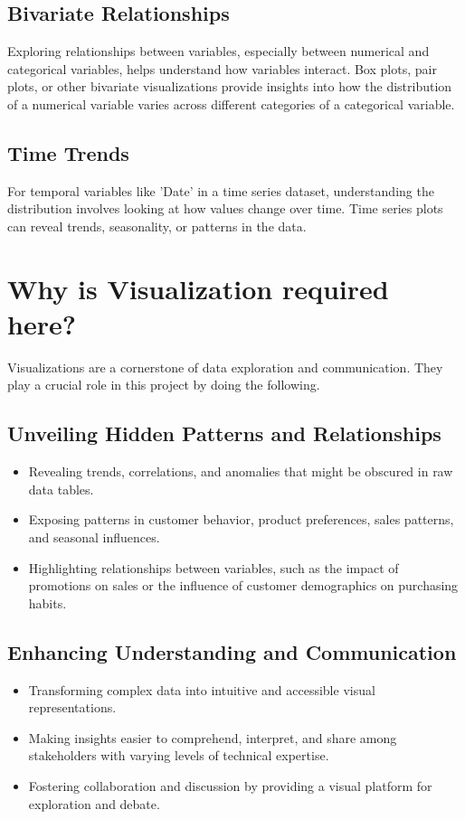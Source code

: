 \subsection{Bivariate Relationships}
Exploring relationships between variables, especially between numerical and categorical variables, helps understand how variables interact. Box plots, pair plots, or other bivariate visualizations provide insights into how the distribution of a numerical variable varies across different categories of a categorical variable.

\subsection{Time Trends}
For temporal variables like 'Date' in a time series dataset, understanding the distribution involves looking at how values change over time. Time series plots can reveal trends, seasonality, or patterns in the data.



\section{Why is Visualization required here?} 
Visualizations are a cornerstone of data exploration and communication. They play a crucial role in this project by doing the following.

\subsection{Unveiling Hidden Patterns and Relationships}
\begin{itemize}
\item Revealing trends, correlations, and anomalies that might be obscured in raw data tables.
\item Exposing patterns in customer behavior, product preferences, sales patterns, and seasonal influences.
\item Highlighting relationships between variables, such as the impact of promotions on sales or the influence of customer demographics on purchasing habits.
\end{itemize}


\subsection{Enhancing Understanding and Communication}
\begin{itemize}

\item Transforming complex data into intuitive and accessible visual representations. 
\item Making insights easier to comprehend, interpret, and share among stakeholders with varying levels of technical expertise.
\item Fostering collaboration and discussion by providing a visual platform for exploration and debate.
\end{itemize}

